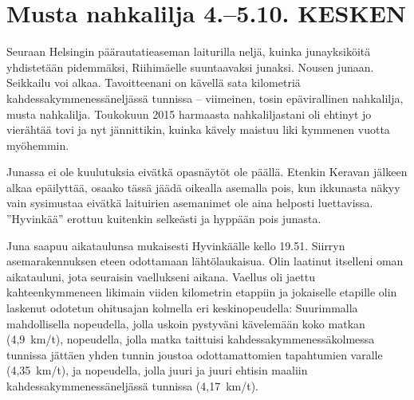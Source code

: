 \section{Musta nahkalilja 4.--5.10. KESKEN}

\begin{multicols}{2}
\noindent Seuraan Helsingin päärautatieaseman laiturilla neljä, kuinka 
junayksiköitä yhdistetään pidemmäksi, Riihimäelle suuntaavaksi junaksi. 
Nousen junaan. Seikkailu voi alkaa. Tavoitteenani on kävellä sata kilometriä 
kahdessakymmenessäneljässä tunnissa -- viimeinen, tosin epävirallinen 
nahkalilja, musta nahkalilja. Toukokuun 2015 harmaasta nahkaliljastani oli 
ehtinyt jo vierähtää tovi ja nyt jännittikin, kuinka kävely maistuu liki 
kymmenen vuotta myöhemmin.

Junassa ei ole kuulutuksia eivätkä opasnäytöt ole päällä. Etenkin 
Keravan jälkeen alkaa epäilyttää, osaako tässä jäädä oikealla asemalla 
pois, kun ikkunasta näkyy vain sysimustaa eivätkä laituirien asemanimet ole 
aina helposti luettavissa. ''Hyvinkää'' erottuu kuitenkin selkeästi ja 
hyppään pois junasta. 

Juna saapuu aikataulunsa mukaisesti Hyvinkäälle kello 19.51. Siirryn 
asemarakennuksen eteen odottamaan lähtölaukaisua. Olin laatinut itselleni 
oman aikatauluni, jota seuraisin vaellukseni aikana. Vaellus oli jaettu 
kahteenkymmeneen likimain viiden kilometrin etappiin ja jokaiselle etapille 
olin laskenut odotetun ohitusajan kolmella eri keskinopeudella: Suurimmalla 
mahdollisella nopeudella, jolla uskoin pystyväni kävelemään koko matkan 
(4,9~km/t), nopeudella, jolla matka taittuisi kahdessakymmenessäkolmessa 
tunnissa jättäen yhden tunnin joustoa odottamattomien tapahtumien varalle 
(4,35~km/t), ja nopeudella, jolla juuri ja juuri ehtisin maaliin 
kahdessakymmenessäneljässä tunnissa (4,17~km/t).


\end{multicols}
